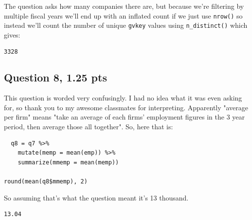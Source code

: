 \documentclass[11pt]{article}
\begin{document}
The question asks how many companies there are, but because we're filtering by multiple fiscal years we'll end up with an inflated count if we just use \texttt{nrow()} so instead we'll count the number of unique \texttt{gvkey} values using \texttt{n\_distinct()} which gives:

\begin{verbatim}
3328
\end{verbatim}


\newpage

\subsection*{Question 8, 1.25 pts}
\label{sec:orgd4850e3}
This question is worded very confusingly.  I had no idea what it was even asking for, so thank you to my awesome classmates for interpreting.  Apparently "average per firm" means "take an average of each firms' employment figures in the 3 year period, then average those all together".  So, here that is:

\begin{verbatim}
  q8 = q7 %>%
    mutate(memp = mean(emp)) %>%
    summarize(mmemp = mean(memp))

round(mean(q8$mmemp), 2)
\end{verbatim}

So assuming that's what the question meant it's 13 thousand.

\begin{verbatim}
13.04
\end{verbatim}
\end{document}
